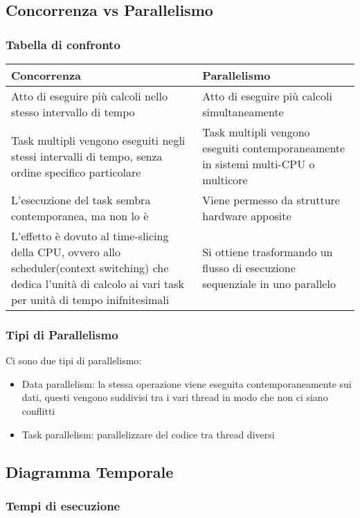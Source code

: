 \documentclass[a4paper]{article}
\begin{document}
\subsection{Concorrenza vs Parallelismo}
\subsubsection*{Tabella di confronto}
\begin{center}
\centering
\begin{tabularx}{\textwidth}{|X|X|}
	\hline
	\textbf{Concorrenza} & \textbf{Parallelismo} \\
	\hline
	Atto di eseguire più calcoli nello stesso intervallo di tempo & Atto di eseguire più calcoli simultaneamente \\
	\hline
	Task multipli vengono eseguiti negli stessi intervalli di tempo, senza ordine specifico particolare & Task multipli vengono eseguiti contemporaneamente in sistemi multi-CPU o multicore \\
	\hline
	L'esecuzione del task sembra contemporanea, ma non lo è & Viene permesso da strutture hardware apposite \\
	\hline
	L'effetto è dovuto al time-slicing della CPU, ovvero allo scheduler(context switching) che dedica l'unità di calcolo ai vari task per unità di tempo inifnitesimali & Si ottiene trasformando un flusso di esecuzione sequenziale in uno parallelo \\
	\hline
\end{tabularx}
\end{center}
\subsubsection*{Tipi di Parallelismo}
Ci sono due tipi di parallelismo:
\begin{itemize}
	\item Data parallelism: la stessa operazione viene eseguita contemporaneamente sui dati, questi vengono suddivisi tra i vari thread in modo che non ci siano conflitti
	\item Task parallelism: parallelizzare del codice tra thread diversi
\end{itemize}
\subsection{Diagramma Temporale}
\subsubsection*{Tempi di esecuzione}
\end{document}
